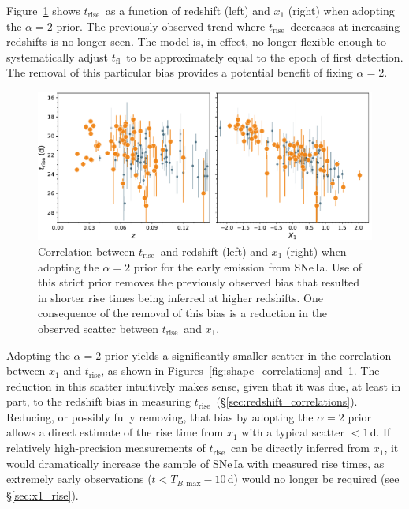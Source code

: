 \documentclass[twocolumn]{./aastex63}
\newcommand{\tfl}{$t_\mathrm{fl}$}
\newcommand{\trise}{$t_\mathrm{rise}$}
\begin{document}
Figure~\ref{fig:tsquared_z_evolution} shows \trise\ as a function of redshift
(left) and $x_1$ (right) when adopting the $\alpha = 2$ prior. The previously
observed trend where \trise\ decreases at increasing redshifts is no longer
seen. The model is, in effect, no longer flexible enough to systematically
adjust \tfl\ to be approximately equal to the epoch of first detection. The
removal of this particular bias provides a potential benefit of fixing $\alpha
= 2$.

\begin{figure}
    \centering
    \includegraphics[width=6in]{./figures/trise_z_tsquared.pdf}
    \caption{Correlation between \trise\ and redshift (left) and $x_1$ (right)
    when adopting the $\alpha = 2$ prior for the early emission from SNe\,Ia.
    Use of this strict prior removes the previously observed bias that
    resulted in shorter rise times being inferred at higher redshifts. One
    consequence of the removal of this bias is a reduction in the observed
    scatter between \trise\ and $x_1$.}
    \label{fig:tsquared_z_evolution}
\end{figure}


Adopting the $\alpha = 2$ prior yields a significantly smaller scatter in the
correlation between $x_1$ and \trise, as shown in
Figures~\ref{fig:shape_correlations} and~\ref{fig:tsquared_z_evolution}. The
reduction in this scatter intuitively makes sense, given that it was due, at
least in part, to the redshift bias in measuring \trise\
(\S\ref{sec:redshift_correlations}). Reducing, or possibly fully removing,
that bias by adopting the $\alpha = 2$ prior allows a direct estimate of the
rise time from $x_1$ with a typical scatter $< 1$\,d. If relatively
high-precision measurements of \trise\ can be directly inferred from $x_1$, it
would dramatically increase the sample of SNe\,Ia with measured rise times, as
extremely early observations ($t < T_{B,\mathrm{max}}-10$\,d) would no longer
be required (see \S\ref{sec:x1_rise}).
\end{document}
